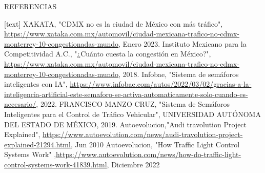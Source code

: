 \documentclass[
	11pt, %
]{beamer}
\begin{document}
\begin{frame}{REFERENCIAS}
  \begin{thebibliography}{10}
    [text]
    XAKATA, "CDMX no es la ciudad de México con más tráfico", \url{https://www.xataka.com.mx/automovil/ciudad-mexicana-trafico-no-cdmx-monterrey-10-congestionadas-mundo}, Enero 2023.
    Instituto Mexicano para la Competitividad A.C., "¿Cuánto cuesta la congestión en México?", \url{https://www.xataka.com.mx/automovil/ciudad-mexicana-trafico-no-cdmx-monterrey-10-congestionadas-mundo}, 2018.
    Infobae, "Sistema de semáforos inteligentes con IA", \url{https://www.infobae.com/autos/2022/03/02/gracias-a-la-inteligencia-artificial-este-semaforo-se-activa-automaticamente-solo-cuando-es-necesario/}, 2022.
    FRANCISCO MANZO CRUZ, "Sistema de Semáforos Inteligentes para el Control de Tráfico Vehicular", UNIVERSIDAD AUTÓNOMA DEL ESTADO DE MÉXICO, 2019.
    Autoevolucion,"Audi travolution Project Explained", \url{https://www.autoevolution.com/news/audi-travolution-project-explained-21294.html}, Jun 2010
    Autoevolucion, "How Traffic Light Control Systems Work" ,\url{https://www.autoevolution.com/news/how-do-traffic-light-control-systems-work-41839.html}, Diciembre 2022
  \end{thebibliography}
\end{frame}
\end{document}
